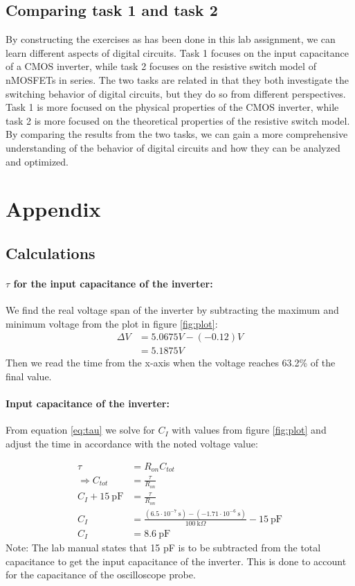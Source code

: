 \documentclass[onecolumn]{article}
\begin{document}
\subsection{Comparing task 1 and task 2}
By constructing the exercises as has been done in this lab assignment, we can learn different aspects of digital circuits. Task 1 focuses on the input capacitance of a CMOS inverter, while task 2 focuses on the resistive switch model of nMOSFETs in series. The two tasks are related in that they both investigate the switching behavior of digital circuits, but they do so from different perspectives. Task 1 is more focused on the physical properties of the CMOS inverter, while task 2 is more focused on the theoretical properties of the resistive switch model. By comparing the results from the two tasks, we can gain a more comprehensive understanding of the behavior of digital circuits and how they can be analyzed and optimized.

\section{Appendix}
\subsection{Calculations}
\paragraph{$\tau$ for the input capacitance of the inverter:}
We find the real voltage span of the inverter by subtracting the maximum and minimum voltage from the plot in figure \ref{fig:plot}:
\begin{align}
  \Delta V &= 5.0675 V - (-0.12) V \nonumber \\
  &= 5.1875 V \nonumber
\end{align}
Then we read the time from the x-axis when the voltage reaches 63.2\% of the final value.


\paragraph{Input capacitance of the inverter:} 
From equation \ref{eq:tau} we solve for $C_{I}$ with values from figure \ref{fig:plot} and adjust the time in accordance with the noted voltage value:

\begin{align}
    \tau &= R_{on}C_{tot} \nonumber \\
    \Rightarrow C_{tot} &= \frac{\tau}{R_{on}} \nonumber \\
    C_{I} + 15 \ \text{pF} &= \frac{\tau}{R_{on}} \nonumber \\
    C_{I} &= \frac{(6.5 \cdot 10^{-7} \ \text{s}) - (-1.71 \cdot 10^{-6} \ \text{s})}{100 \ \text{k}\Omega} - 15 \ \text{pF}\nonumber \\
    C_{I} &= 8.6 \ \text{pF} \nonumber
\end{align}
Note: The lab manual states that 15 pF is to be subtracted from the total capacitance to get the input capacitance of the inverter. This is done to account for the capacitance of the oscilloscope probe.
\end{document}
